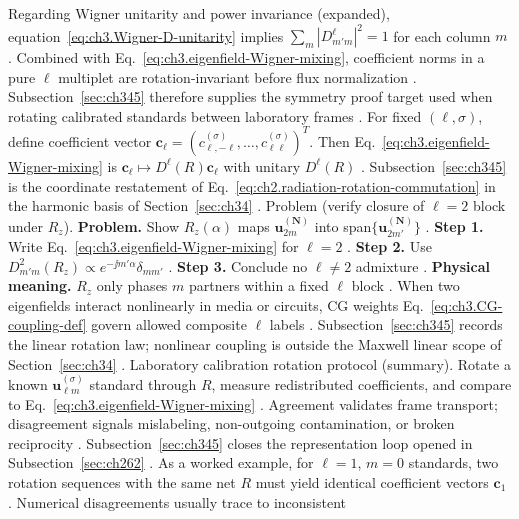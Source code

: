 Regarding Wigner unitarity and power invariance (expanded), equation~\eqref{eq:ch3.Wigner-D-unitarity} implies \(\sum_{m}|D_{m'm}^{\ell}|^{2}=1\) for each column \(m\)
\cite{jackson1999}. Combined with Eq.~\eqref{eq:ch3.eigenfield-Wigner-mixing}, coefficient norms in a
pure \(\ell\) multiplet are rotation-invariant before flux normalization \cite{stratton1941}. Subsection~\ref{sec:ch345}
therefore supplies the symmetry proof target used when rotating calibrated standards between laboratory frames
\cite{hansen1988}.
For fixed \((\ell,\sigma)\), define coefficient vector \(\mathbf{c}_\ell=(c_{\ell,-\ell}^{(\sigma)},\ldots,c_{\ell\ell}^{(\sigma)})^{T}\).
Then Eq.~\eqref{eq:ch3.eigenfield-Wigner-mixing} is \(\mathbf{c}_\ell\mapsto D^{\ell}(R)\mathbf{c}_\ell\) with unitary
\(D^{\ell}(R)\) \cite{jackson1999}. Subsection~\ref{sec:ch345} is the coordinate restatement of
Eq.~\eqref{eq:ch2.radiation-rotation-commutation} in the harmonic basis of Section~\ref{sec:ch34}
\cite{stratton1941}.
Problem (verify closure of \(\ell=2\) block under \(R_{z}\)). \textbf{Problem.} Show \(R_{z}(\alpha)\) maps \(\mathbf{u}_{2m}^{(\mathbf{N})}\) into span\(\{\mathbf{u}_{2m'}^{(\mathbf{N})}\}\)
\cite{jackson1999}.
\textbf{Step 1.} Write Eq.~\eqref{eq:ch3.eigenfield-Wigner-mixing} for \(\ell=2\) \cite{hansen1988}.
\textbf{Step 2.} Use \(D_{m'm}^{2}(R_{z})\propto e^{-\jj m'\alpha}\delta_{mm'}\) \cite{jackson1999}.
\textbf{Step 3.} Conclude no \(\ell\neq2\) admixture \cite{stratton1941}.
\textbf{Physical meaning.} \(R_{z}\) only phases \(m\) partners within a fixed \(\ell\) block \cite{harrington2001}.
When two eigenfields interact nonlinearly in media or circuits, CG weights Eq.~\eqref{eq:ch3.CG-coupling-def} govern
allowed composite \(\ell\) labels \cite{jackson1999}. Subsection~\ref{sec:ch345} records the linear rotation
law; nonlinear coupling is outside the Maxwell linear scope of Section~\ref{sec:ch34} \cite{stratton1941}.
Laboratory calibration rotation protocol (summary). Rotate a known \(\mathbf{u}_{\ell m}^{(\sigma)}\) standard through \(R\), measure redistributed coefficients, and
compare to Eq.~\eqref{eq:ch3.eigenfield-Wigner-mixing} \cite{harrington2001}. Agreement validates
frame transport; disagreement signals mislabeling, non-outgoing contamination, or broken reciprocity
\cite{stratton1941}. Subsection~\ref{sec:ch345} closes the representation loop opened in
Subsection~\ref{sec:ch262} \cite{stratton1941}.
As a worked example, for \(\ell=1\), \(m=0\) standards, two rotation sequences with the same net \(R\) must yield identical coefficient
vectors \(\mathbf{c}_1\) \cite{jackson1999}. Numerical disagreements usually trace to inconsistent
